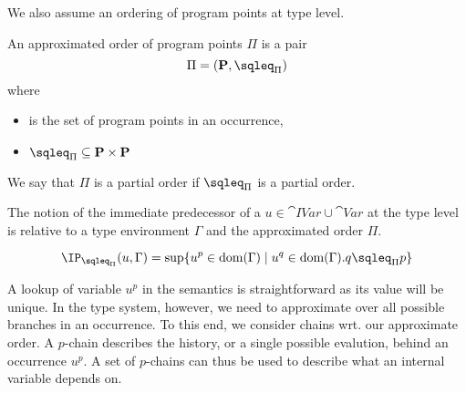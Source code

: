 \documentclass{eptcs}
\begin{document}
We also assume an ordering of program points at type level.

\begin{definition}
	An approximated order of program points $\Pi$ is a pair
	\[ \Pi=(\cat{P},\sqleq_\Pi) \]
	where
	\begin{itemize}
		\item {} is the set of program points in an occurrence,
		\item $\sqleq_\Pi\subseteq\cat{P}\times\cat{P}$
	\end{itemize}
	We say that $\Pi$ is a partial order if $\sqleq_\Pi$ is a partial order.
\end{definition}

The notion of the immediate predecessor of a $u\in\cat{IVar} \cup \cat{Var}$ at the type level is relative to a type environment $\Gamma$ and the approximated order $\Pi$.

\begin{definition}\label{def:GBindPi}
	\[ \IP_{\sqleq_\Pi}(u,\Gamma)=\sup\{u^p\in
          \dom(\Gamma)\mid u^q\in \dom(\Gamma).q\sqleq_\Pi p\} \]
\end{definition}

A lookup of variable $u^p$ in the semantics is straightforward as its
value will be unique. In the type system, however, we need to
approximate over all possible branches in an occurrence.  To this end,
we consider chains wrt. our approximate order. A $p$-chain describes
the history, or a single possible evalution, behind an occurrence $u^p$.
A set of $p$-chains can thus be used to describe what an internal variable depends on.



\end{document}
